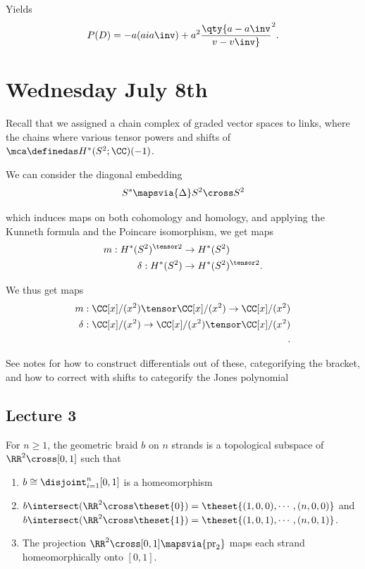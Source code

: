 \begin{description}
\tightlist
\item[Example (The Hopf Link)]
Yields \begin{align*}
P(D) = -a(aia\inv) + a^2 \qty{a-a\inv \over v-v\inv}^2
.\end{align*}
\end{description}

\hypertarget{wednesday-july-8th}{%
\section{Wednesday July 8th}\label{wednesday-july-8th}}

Recall that we assigned a chain complex of graded vector spaces to
links, where the chains where various tensor powers and shifts of
\(\mca \definedas H^*(S^2; \CC)(-1)\).

We can consider the diagonal embedding \begin{align*}
S^s \mapsvia{\Delta} S^2 \cross S^2
\end{align*}

which induces maps on both cohomology and homology, and applying the
Kunneth formula and the Poincare isomorphism, we get maps \begin{align*}
m:      H^*(S^2)^{\tensor 2} &\to H^*(S^2) \\
\delta: H^*(S^2) &\to H^*(S^2)^{\tensor 2}
.\end{align*}

We thus get maps \begin{align*}
m:        \CC[x]/(x^2) \tensor \CC[x]/(x^2) \to \CC[x]/(x^2) \\
\delta:   \CC[x]/(x^2) \to \CC[x]/(x^2) \tensor \CC[x]/(x^2) \\
.\end{align*}

See notes for how to construct differentials out of these, categorifying
the bracket, and how to correct with shifts to categorify the Jones
polynomial

\hypertarget{lecture-3}{%
\subsection{Lecture 3}\label{lecture-3}}

For \(n\geq 1\), the geometric braid \(b\) on \(n\) strands is a
topological subspace of \(\RR^2 \cross [0, 1]\) such that

\begin{enumerate}
\def\labelenumi{\alph{enumi}.}
\tightlist
\item
  \(b \cong \disjoint_{i=1}^n [0, 1]\) is a homeomorphism
\item
  \(b\intersect (\RR^2 \cross \theset{0}) = \theset{(1,0,0), \cdots, (n,0,0)}\)
  and
  \(b\intersect (\RR^2 \cross \theset{1}) = \theset{(1,0,1), \cdots, (n,0,1)}\).
\item
  The projection \(\RR^2 \cross [0, 1] \mapsvia{\mathrm{pr}_2}\) maps
  each strand homeomorphically onto \([0, 1]\).
\end{enumerate}

